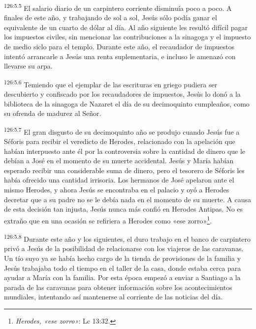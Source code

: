 \par 
\textsuperscript{126:5.5} El salario diario de un carpintero corriente disminuía poco a poco. A finales de este año, y trabajando de sol a sol, Jesús sólo podía ganar el equivalente de un cuarto de dólar al día. Al año siguiente les resultó difícil pagar los impuestos civiles, sin mencionar las contribuciones a la sinagoga y el impuesto de medio siclo para el templo. Durante este año, el recaudador de impuestos intentó arrancarle a Jesús una renta suplementaria, e incluso le amenazó con llevarse su arpa.

\par 
\textsuperscript{126:5.6} Temiendo que el ejemplar de las escrituras en griego pudiera ser descubierto y confiscado por los recaudadores de impuestos, Jesús lo donó a la biblioteca de la sinagoga de Nazaret el día de su decimoquinto cumpleaños, como su ofrenda de madurez al Señor.

\par 
\textsuperscript{126:5.7} El gran disgusto de su decimoquinto año se produjo cuando Jesús fue a Séforis para recibir el veredicto de Herodes, relacionado con la apelación que habían interpuesto ante él por la controversia sobre la cantidad de dinero que le debían a José en el momento de su muerte accidental. Jesús y María habían esperado recibir una considerable suma de dinero, pero el tesorero de Séforis les había ofrecido una cantidad irrisoria. Los hermanos de José apelaron ante el mismo Herodes, y ahora Jesús se encontraba en el palacio y oyó a Herodes decretar que a su padre no se le debía nada en el momento de su muerte. A causa de esta decisión tan injusta, Jesús nunca más confió en Herodes Antipas. No es extraño que en una ocasión se refiriera a Herodes como «ese zorro»\footnote{\textit{Herodes, «ese zorro»}: Lc 13:32.}.

\par 
\textsuperscript{126:5.8} Durante este año y los siguientes, el duro trabajo en el banco de carpintero privó a Jesús de la posibilidad de relacionarse con los viajeros de las caravanas. Un tío suyo ya se había hecho cargo de la tienda de provisiones de la familia y Jesús trabajaba todo el tiempo en el taller de la casa, donde estaba cerca para ayudar a María con la familia. Por esta época empezó a enviar a Santiago a la parada de las caravanas para obtener información sobre los acontecimientos mundiales, intentando así mantenerse al corriente de las noticias del día.

